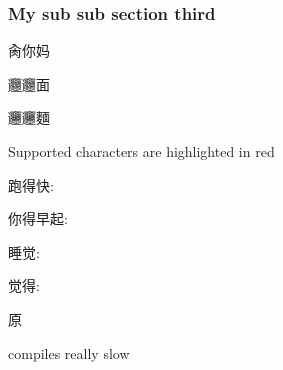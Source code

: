 \subsubsection{My sub sub section third} \label{sub:My sub sub section third}

肏你妈

𰻝𰻝面

𰻞𰻞麵

\par{}
\par{}
\par Supported characters are highlighted in red
\par{}
\par{}
\par{}

跑得快: 

你得早起: 

睡觉: 

觉得: \textit{\textbf{}}

\textbf{}


原 

compiles really slow



\section{\expandafter\MakeUppercase \RumusanUmumB{}} \label{sec:RumusanUmumB}
